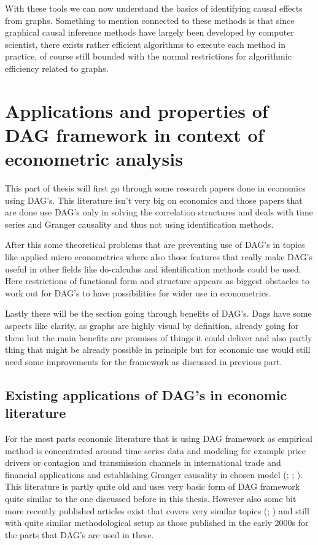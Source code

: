 \documentclass[main=english,12pt,a4paper,pdftex,econ,utf8]{aaltothesis}
\begin{document}
\noindent With these tools we can now understand the basics of identifying causal effects from graphs. Something to mention connected to these methods is that since graphical causal inference methods have largely been developed by computer scientist, there exists rather efficient algorithms to execute each method in practice, of course still bounded with the normal restrictions for algorithmic efficiency related to graphs.

\clearpage

\section{Applications and properties of DAG framework in context of econometric analysis}

This part of thesis will first go through some research papers done in economics using DAG's. This literature isn't very big on economics and those papers that are done use DAG's only in solving the correlation structures and deals with time series and Granger causality and thus not using identification methods.

After this some theoretical problems that are preventing use of DAG's in topics like applied micro econometrics where also those features that really make DAG's useful in other fields like do-calculus and identification methods could be used. Here restrictions of functional form and structure appears as biggest obstacles to work out for DAG's to have possibilities for wider use in econometrics.

Lastly there will be the section going through benefits of DAG's. Dags have some aspects like clarity, as graphs are highly visual by definition, already going for them but the main benefits are promises of things it could deliver and also partly thing that might be already possible in principle but for economic use would still need some improvements for the framework as discussed in previous part.

\subsection{Existing applications of DAG's in economic literature}

For the most parts economic literature that is using DAG framework as empirical method is concentrated around time series data and modeling for example price drivers or contagion and transmission channels in international trade and financial applications and establishing Granger causality in chosen model (\cite{Awokuse2003}; \cite{Bessler2003}; \cite{Yang2006}). This literature is partly quite old and uses very basic form of DAG framework quite similar to the one discussed before in this thesis. However also some bit more recently published articles exist that covers very similar topics (\cite{Jayech2016}; \cite{Ji2018}) and still with quite  similar methodological setup as those published in the early 2000s for the parts that DAG's are used in these.
\end{document}
